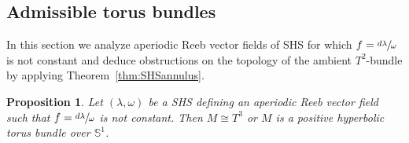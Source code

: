 \documentclass[JEP,XML,SOM,Unicode,NoEqCountersInSection,NoFloatCountersInSection,published]{cedram}
\newtheorem{prop}[theorem]{Proposition}
\theoremstyle{definition}
\newcommand{\mS}{\mathbb{S}}
\begin{document}
\subsection{Admissible torus bundles}

In this section we analyze aperiodic Reeb vector fields of SHS for which $f=\sfrac{d\lambda}{\omega}$ is not constant and deduce obstructions on the topology of the ambient $T^2$-bundle by applying Theorem~\ref{thm:SHSannulus}.

\begin{prop}\label{prop:bundles}
Let $(\lambda, \omega)$ be a SHS defining an aperiodic Reeb vector field such that $f=\sfrac{d\lambda}{\omega}$ is not constant. Then $M\cong T^3$ or $M$ is a positive hyperbolic torus bundle over $\mS^1$.
\end{prop}
\end{document}
